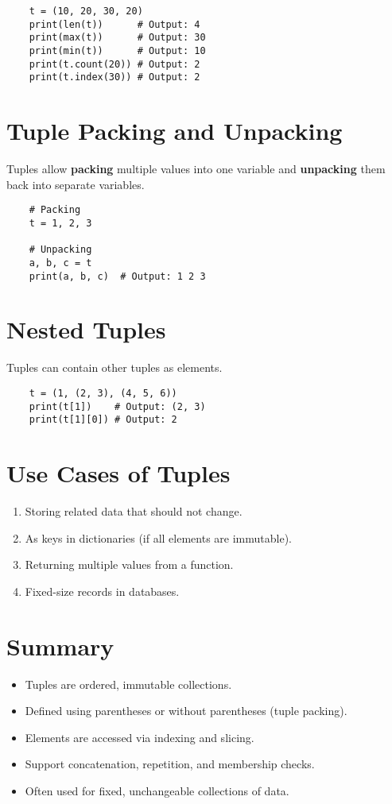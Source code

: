 \begin{verbatim}
	t = (10, 20, 30, 20)
	print(len(t))      # Output: 4
	print(max(t))      # Output: 30
	print(min(t))      # Output: 10
	print(t.count(20)) # Output: 2
	print(t.index(30)) # Output: 2
\end{verbatim}

\section{Tuple Packing and Unpacking}
Tuples allow \textbf{packing} multiple values into one variable and \textbf{unpacking} them back into separate variables.

\begin{verbatim}
	# Packing
	t = 1, 2, 3
	
	# Unpacking
	a, b, c = t
	print(a, b, c)  # Output: 1 2 3
\end{verbatim}

\section{Nested Tuples}
Tuples can contain other tuples as elements.

\begin{verbatim}
	t = (1, (2, 3), (4, 5, 6))
	print(t[1])    # Output: (2, 3)
	print(t[1][0]) # Output: 2
\end{verbatim}

\section{Use Cases of Tuples}
\begin{enumerate}
	\item Storing related data that should not change.
	\item As keys in dictionaries (if all elements are immutable).
	\item Returning multiple values from a function.
	\item Fixed-size records in databases.
\end{enumerate}

\section{Summary}
\begin{itemize}
	\item Tuples are ordered, immutable collections.
	\item Defined using parentheses or without parentheses (tuple packing).
	\item Elements are accessed via indexing and slicing.
	\item Support concatenation, repetition, and membership checks.
	\item Often used for fixed, unchangeable collections of data.
\end{itemize}
